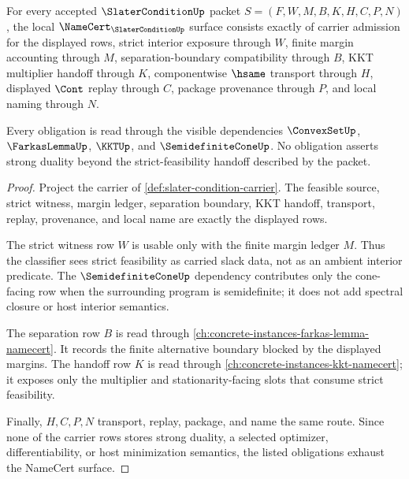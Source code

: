 \begin{theorem}
\label{thm:slater-condition-namecert-obligations}
For every accepted $\SlaterConditionUp$ packet $S=(F,W,M,B,K,H,C,P,N)$, the local $\NameCert_{\SlaterConditionUp}$ surface consists exactly of carrier admission for the displayed rows, strict interior exposure through $W$, finite margin accounting through $M$, separation-boundary compatibility through $B$, KKT multiplier handoff through $K$, componentwise $\hsame$ transport through $H$, displayed $\Cont$ replay through $C$, package provenance through $P$, and local naming through $N$.

Every obligation is read through the visible dependencies $\ConvexSetUp$, $\FarkasLemmaUp$, $\KKTUp$, and $\SemidefiniteConeUp$. No obligation asserts strong duality beyond the strict-feasibility handoff described by the packet.
\end{theorem}
\begin{proof}
Project the carrier of \autoref{def:slater-condition-carrier}. The feasible source, strict witness, margin ledger, separation boundary, KKT handoff, transport, replay, provenance, and local name are exactly the displayed rows.

The strict witness row $W$ is usable only with the finite margin ledger $M$. Thus the classifier sees strict feasibility as carried slack data, not as an ambient interior predicate. The $\SemidefiniteConeUp$ dependency contributes only the cone-facing row when the surrounding program is semidefinite; it does not add spectral closure or host interior semantics.

The separation row $B$ is read through \autoref{ch:concrete-instances-farkas-lemma-namecert}. It records the finite alternative boundary blocked by the displayed margins. The handoff row $K$ is read through \autoref{ch:concrete-instances-kkt-namecert}; it exposes only the multiplier and stationarity-facing slots that consume strict feasibility.

Finally, $H,C,P,N$ transport, replay, package, and name the same route. Since none of the carrier rows stores strong duality, a selected optimizer, differentiability, or host minimization semantics, the listed obligations exhaust the NameCert surface.
\end{proof}

